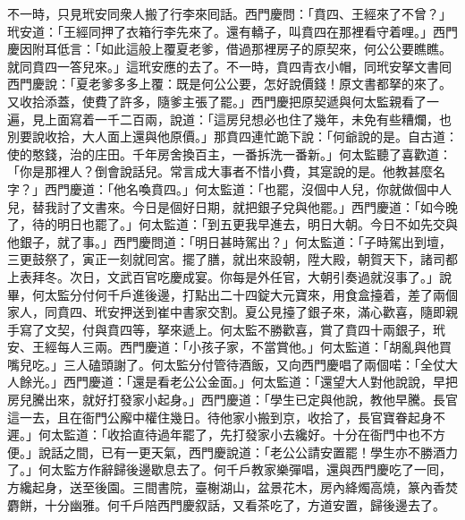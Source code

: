 不一時，只見玳安同衆人搬了行李來囘話。西門慶問：「賁四、王經來了不曾？」玳安道：「王經同押了衣箱行李先來了。還有轎子，叫賁四在那裡看守着哩。」西門慶因附耳低言：「如此這般上覆夏老爹，借過那裡房子的原契來，何公公要瞧瞧。就同賁四一答兒來。」這玳安應的去了。不一時，賁四青衣小帽，同玳安拏文書囘西門慶說：「夏老爹多多上覆：既是何公公要，怎好說價錢！原文書都拏的來了。又收拾添蓋，使費了許多，隨爹主張了罷。」西門慶把原契遞與何太監親看了一遍，見上面寫着一千二百兩，說道：「這房兒想必也住了幾年，未免有些糟爛，也別要說收拾，大人面上還與他原價。」那賁四連忙跪下說：「何爺說的是。自古道：使的憨錢，治的庄田。千年房舍換百主，一番拆洗一番新。」何太監聽了喜歡道：{}「你是那裡人？倒會說話兒。常言成大事者不惜小費，其寔說的是。他教甚麼名字？」西門慶道：「他名喚賁四。」何太監道：「也罷，沒個中人兒，你就做個中人兒，替我討了文書來。今日是個好日期，就把銀子兌與他罷。」{}西門慶道：「如今晚了，待的明日也罷了。」何太監道：「到五更我早進去，明日大朝。今日不如先交與他銀子，就了事。」西門慶問道：「明日甚時駕出？」何太監道：「子時駕出到壇，三更鼓祭了，寅正一刻就囘宮。擺了膳，就出來設朝，陞大殿，朝賀天下，諸司都上表拜冬。{}次日，文武百官吃慶成宴。你每是外任官，大朝引奏過就沒事了。」說畢，何太監分付何千戶進後邊，打點出二十四錠大元寶來，用食盒擡着，差了兩個家人，同賁四、玳安押送到崔中書家交割。夏公見擡了銀子來，滿心歡喜，隨即親手寫了文契，付與賁四等，拏來遞上。何太監不勝歡喜，賞了賁四十兩銀子，玳安、王經每人三兩。西門慶道：「小孩子家，不當賞他。」何太監道：「胡亂與他買嘴兒吃。」三人磕頭謝了。何太監分付管待酒飯，又向西門慶唱了兩個喏：「全仗大人餘光。」西門慶道：「還是看老公公金面。」何太監道：「還望大人對他說說，早把房兒騰出來，就好打發家小起身。」西門慶道：「學生已定與他說，教他早騰。長官這一去，且在衙門公廨中權住幾日。待他家小搬到京，收拾了，長官寶眷起身不遲。」何太監道：「收拾直待過年罷了，先打發家小去纔好。十分在衙門中也不方便。」說話之間，已有一更天氣，西門慶說道：「老公公請安置罷！學生亦不勝酒力了。」何太監方作辭歸後邊歇息去了。何千戶教家樂彈唱，還與西門慶吃了一囘，方纔起身，送至後園。三間書院，臺榭湖山，盆景花木，房內絳燭高燒，篆內香焚麝餅，十分幽雅。何千戶陪西門慶叙話，又看茶吃了，方道安置，歸後邊去了。

